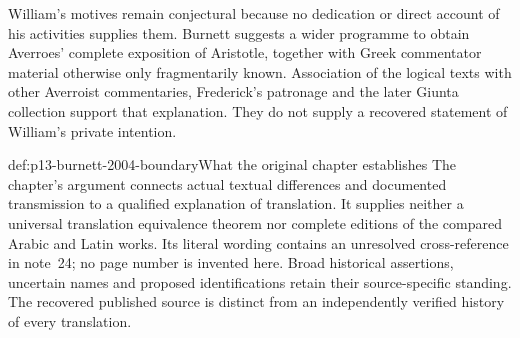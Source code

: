 William's motives remain conjectural because no dedication
or direct account of his activities supplies them. Burnett
suggests a wider programme to obtain Averroes' complete
exposition of Aristotle, together with Greek commentator
material otherwise only fragmentarily known. Association
of the logical texts with other Averroist commentaries,
Frederick's patronage and the later Giunta collection support
that explanation. They do not supply a recovered statement
of William's private intention.
\cite[pp.~605--606]{Burnett2004ArabicLatinHHL}

\begin{proofboundary}{def:p13-burnett-2004-boundary}{What the original chapter establishes}
The chapter's argument connects actual textual differences
and documented transmission to a qualified explanation
of translation. It supplies neither a universal translation
equivalence theorem nor complete editions of the compared
Arabic and Latin works. Its literal wording contains an
unresolved cross-reference in note~24; no page number is
invented here. Broad historical assertions, uncertain names
and proposed identifications retain their source-specific
standing. The recovered published source is distinct from
an independently verified history of every translation.
\end{proofboundary}
